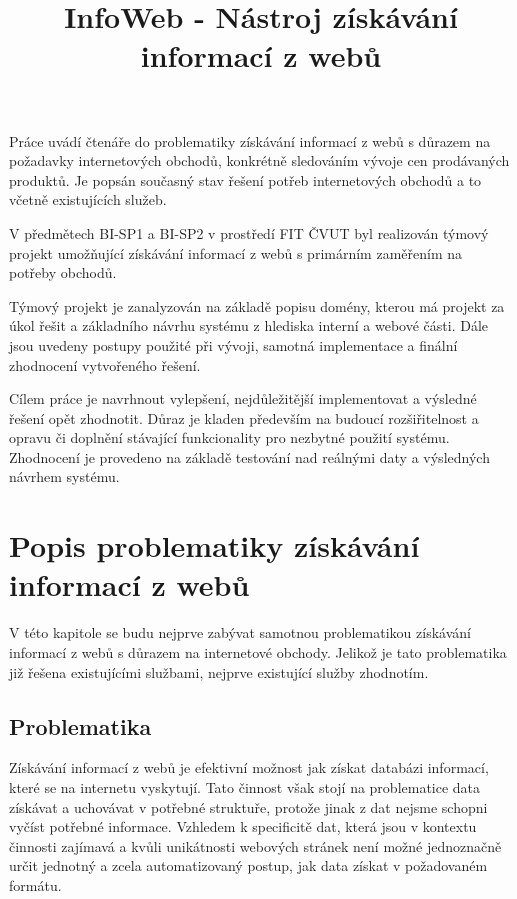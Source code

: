 \documentclass[thesis=B,czech]{FITthesis}[2012/06/26]
\title{ InfoWeb - Nástroj získávání informací z webů }
\begin{document}

\begin{introduction}
Práce uvádí čtenáře do problematiky získávání informací z webů s důrazem na požadavky internetových obchodů, konkrétně sledováním
vývoje cen prodávaných produktů. Je popsán současný stav řešení potřeb internetových obchodů a to včetně existujících služeb.
\par
V předmětech BI-SP1 a BI-SP2 v prostředí FIT ČVUT byl realizován týmový projekt umožňující získávání informací z webů s primárním zaměřením na potřeby obchodů.
\par
Týmový projekt je zanalyzován na základě popisu domény, kterou má projekt za úkol řešit a základního návrhu systému
z hlediska interní a webové části. Dále jsou uvedeny postupy použité při vývoji, samotná implementace a finální zhodnocení vytvořeného řešení.
\par
Cílem práce je navrhnout vylepšení, nejdůležitější implementovat a výsledné řešení opět zhodnotit. Důraz je kladen především na 
budoucí rozšiřitelnost a opravu či doplnění stávající funkcionality pro nezbytné použití systému. Zhodnocení je provedeno na základě
testování nad reálnými daty a výsledných návrhem systému.
\par

\newpage

\end{introduction}


\chapter{Popis problematiky získávání informací z webů}

V této kapitole se budu nejprve zabývat samotnou problematikou získávání informací 
z webů s důrazem na internetové obchody.
Jelikož je tato problematika již řešena existujícími službami, nejprve existující služby zhodnotím.

\section{Problematika}
Získávání informací z webů je efektivní možnost jak získat databázi informací, které se na internetu vyskytují.
Tato činnost však stojí na problematice data získávat a uchovávat v potřebné struktuře, protože 
jinak z dat nejsme schopni vyčíst potřebné informace.
Vzhledem k specificitě dat, která jsou v kontextu činnosti zajímavá a kvůli unikátnosti webových stránek
není možné jednoznačně určit jednotný a zcela automatizovaný postup, jak data získat v požadovaném formátu.
\end{document}
